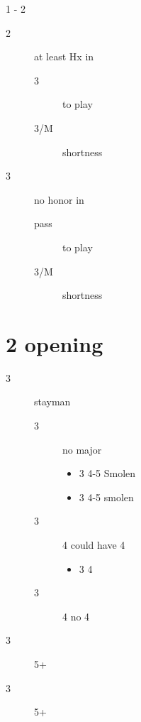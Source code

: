 \documentclass[11pt]{article}
\begin{document}
1 - 2
\begin{description}
\item[{2}] at least Hx in 
\begin{description}
\item[{3}] to play
\item[{3/M}] shortness
\end{description}
\item[{3}] no honor in 
\begin{description}
\item[{pass}] to play
\item[{3/M}] shortness
\end{description}
\end{description}
\section*{2 opening}
\label{sec:org504a6c2}
\begin{description}
\item[{3}] stayman
\begin{description}
\item[{3}] no major
\begin{itemize}
\item 3 4-5 Smolen
\item 3 4-5 smolen
\end{itemize}
\item[{3}] 4 could have 4
\begin{itemize}
\item 3 4
\end{itemize}
\item[{3}] 4 no 4
\end{description}
\item[{3}] 5+
\item[{3}] 5+
\end{description}
\end{document}

